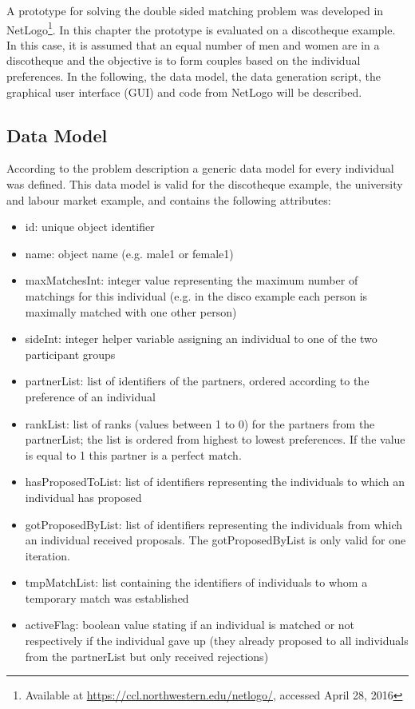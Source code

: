 \label{prototype}
A prototype for solving the double sided matching problem was developed in NetLogo\footnote{Available at \url{https://ccl.northwestern.edu/netlogo/}, accessed April 28, 2016}.
In this chapter the prototype is evaluated on a discotheque example. 
In this case, it is assumed that an equal number of men and women are in a discotheque and the objective is to form couples based on the individual preferences.
In the following, the data model, the data generation script, the graphical user interface (GUI) and code from NetLogo will be described.

\subsection{Data Model}
According to the problem description a generic data model for every individual was defined.
This data model is valid for the discotheque example, the university and labour market example, and contains the following attributes:
\begin{itemize}
	\item id: unique object identifier
	\item name: object name (e.g. male1 or female1)
	\item maxMatchesInt: integer value representing the maximum number of matchings for this individual (e.g. in the disco example each person is maximally matched with one other person)
	\item sideInt: integer helper variable assigning an individual to one of the two participant groups
	\item partnerList: list of identifiers of the partners, ordered according to the preference of an individual
	\item rankList: list of ranks (values between 1 to 0) for the partners from the partnerList; the list is ordered from highest to lowest preferences.
	If the value is equal to 1 this partner is a perfect match.
	\item hasProposedToList: list of identifiers representing the individuals to which an individual has proposed
	\item gotProposedByList: list of identifiers representing the individuals from which an individual received proposals.
	The gotProposedByList is only valid for one iteration.
	\item tmpMatchList: list containing the identifiers of individuals to whom a temporary match was established
	\item activeFlag: boolean value stating if an individual is matched or not respectively if the individual gave up (they already proposed to all individuals from the partnerList but only received rejections)
\end{itemize}


